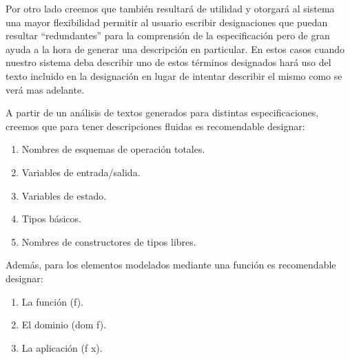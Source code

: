 Por otro lado creemos que también resultará de utilidad y otorgará al sistema una mayor flexibilidad permitir al usuario escribir designaciones que puedan resultar ``redundantes'' para la comprensión de la especificación pero de gran ayuda a la hora de generar una descripción en particular. En estos casos cuando nuestro sistema deba describir uno de estos términos designados hará uso del texto incluido en la designación en lugar de intentar describir el mismo como se verá mas adelante.

A partir de un análisis de textos generados para distintas especificaciones, creemos que para tener descripciones fluidas es recomendable designar:

\begin{enumerate}
	\item Nombres de esquemas de operación totales.
	\item Variables de entrada/salida.
	\item Variables de estado.
	\item Tipos básicos.
	\item Nombres de constructores de tipos libres.
\end{enumerate}

Además, para los elementos modelados mediante una función es recomendable designar:
\begin{enumerate}
	\item La función (f).
	\item El dominio (dom f).
	\item La aplicación (f x).
\end{enumerate}
